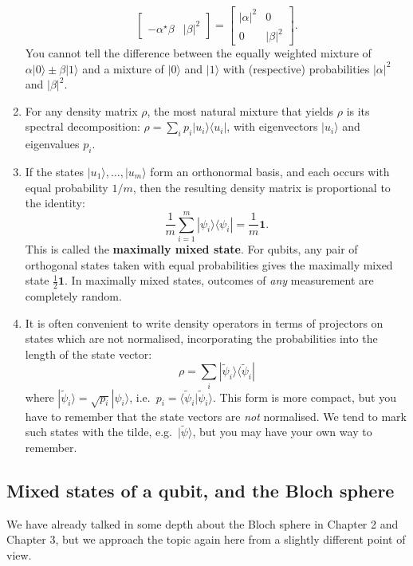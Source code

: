 \documentclass[fleqn]{article}
\begin{document}
\begin{enumerate}
\[\begin{bmatrix}
     \\-\alpha^\star\beta & |\beta|^2
     \end{bmatrix}
     =
     \begin{bmatrix}
       |\alpha|^2 & 0
     \\0 & |\beta|^2
     \end{bmatrix}.
   \]
  You cannot tell the difference between the equally weighted mixture of \(\alpha|0\rangle\pm\beta|1\rangle\) and a mixture of \(|0\rangle\) and \(|1\rangle\) with (respective) probabilities \(|\alpha|^2\) and \(|\beta|^2\).
\item
  For any density matrix \(\rho\), the most natural mixture that yields \(\rho\) is its spectral decomposition: \(\rho=\sum_i p_i|u_i\rangle\langle u_i|\), with eigenvectors \(|u_i\rangle\) and eigenvalues \(p_i\).
\item
  If the states \(|u_1\rangle,\ldots,|u_m\rangle\) form an orthonormal basis, and each occurs with equal probability \(1/m\), then the resulting density matrix is proportional to the identity:
  \[
     \frac{1}{m}\sum_{i=1}^m |\psi_i\rangle\langle\psi_i|
     = \frac{1}{m}\mathbf{1}.
   \]
  This is called the \textbf{maximally mixed state}.
  For qubits, any pair of orthogonal states taken with equal probabilities gives the maximally mixed state \(\frac12\mathbf{1}\).
  In maximally mixed states, outcomes of \emph{any} measurement are completely random.
\item
  It is often convenient to write density operators in terms of projectors on states which are not normalised, incorporating the probabilities into the length of the state vector:
  \[
     \rho = \sum_i|\widetilde\psi_i\rangle\langle\widetilde\psi_i|
   \]
  where \(|\widetilde\psi_i\rangle = \sqrt{p_i}|\psi_i\rangle\), i.e.~\(p_i=\langle\widetilde\psi_i|\widetilde\psi_i\rangle\).
  This form is more compact, but you have to remember that the state vectors are \emph{not} normalised.
  We tend to mark such states with the tilde, e.g.~\(|\widetilde\psi\rangle\), but you may have your own way to remember.
\end{enumerate}

\hypertarget{mixed-states-of-a-qubit-and-the-bloch-sphere}{%
\subsection{Mixed states of a qubit, and the Bloch sphere}\label{mixed-states-of-a-qubit-and-the-bloch-sphere}}

We have already talked in some depth about the Bloch sphere in \protect\hypertarget{chapter2}{}{Chapter 2} and \protect\hypertarget{chapter3}{}{Chapter 3}, but we approach the topic again here from a slightly different point of view.
\end{document}
